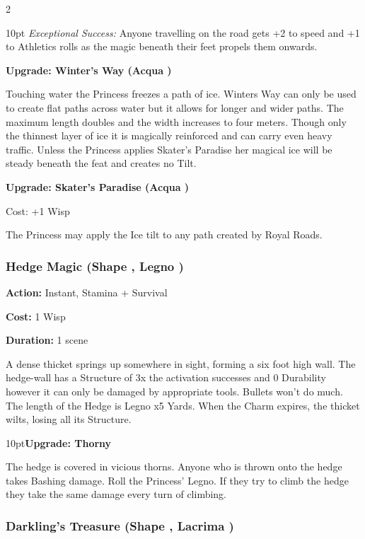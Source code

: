 \begin{multicols}{2}
\begin{myindentpar}{10pt}
\emph{Exceptional Success:} Anyone travelling on the road gets +2 to speed and +1 to Athletics rolls as the magic beneath their feet propels them onwards.

\textbf{Upgrade: Winter's Way (Acqua \textbullet\textbullet\textbullet)}

Touching water the Princess freezes a path of ice. Winters Way can only be used to create flat paths across water but it allows for longer and wider paths. The maximum length doubles and the width increases to four meters. Though only the thinnest layer of ice it is magically reinforced and can carry even heavy traffic. Unless the Princess applies Skater's Paradise her magical ice will be steady beneath the feat and creates no Tilt. 

\textbf{Upgrade: Skater's Paradise (Acqua \textbullet\textbullet\textbullet)}

Cost: +1 Wisp

The Princess may apply the Ice tilt to any path created by Royal Roads.\end{myindentpar}

\subsubsection*{Hedge Magic (Shape \textbullet\textbullet, Legno \textbullet)}

\noindent \textbf{Action:} Instant, Stamina + Survival

\noindent \textbf{Cost:} 1 Wisp

\noindent \textbf{Duration:} 1 scene

A dense thicket springs up somewhere in sight, forming a six foot high wall. The hedge-wall has a Structure of 3x the activation successes and 0 Durability however it can only be damaged by appropriate tools. Bullets won't do much. The length of the Hedge is Legno x5 Yards. When the Charm expires, the thicket wilts, losing all its Structure.

\begin{myindentpar}{10pt}\textbf{Upgrade: Thorny}

The hedge is covered in vicious thorns. Anyone who is thrown onto the hedge takes Bashing damage. Roll the Princess' Legno. If they try to climb the hedge they take the same damage every turn of climbing.\end{myindentpar}

\subsubsection*{Darkling's Treasure (Shape \textbullet\textbullet, Lacrima \textbullet)}


\end{multicols}
